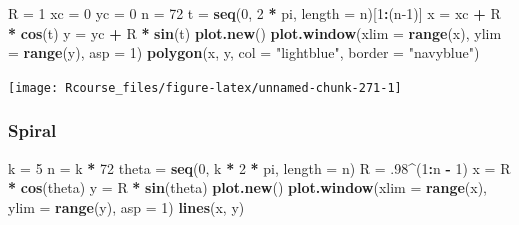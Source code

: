 \documentclass[]{book}
\newenvironment{Shaded}{\begin{snugshade}}{\end{snugshade}}
\newcommand{\DataTypeTok}[1]{\textcolor[rgb]{0.13,0.29,0.53}{#1}}
\newcommand{\DecValTok}[1]{\textcolor[rgb]{0.00,0.00,0.81}{#1}}
\newcommand{\FloatTok}[1]{\textcolor[rgb]{0.00,0.00,0.81}{#1}}
\newcommand{\KeywordTok}[1]{\textcolor[rgb]{0.13,0.29,0.53}{\textbf{#1}}}
\newcommand{\NormalTok}[1]{#1}
\newcommand{\OperatorTok}[1]{\textcolor[rgb]{0.81,0.36,0.00}{\textbf{#1}}}
\newcommand{\StringTok}[1]{\textcolor[rgb]{0.31,0.60,0.02}{#1}}
\theoremstyle{definition}
\theoremstyle{definition}
\theoremstyle{definition}
\theoremstyle{remark}
\begin{document}
\begin{Shaded}
\begin{Highlighting}[]
\NormalTok{R =}\StringTok{ }\DecValTok{1}
\NormalTok{xc =}\StringTok{ }\DecValTok{0}
\NormalTok{yc =}\StringTok{ }\DecValTok{0}
\NormalTok{n =}\StringTok{ }\DecValTok{72}
\NormalTok{t =}\StringTok{ }\KeywordTok{seq}\NormalTok{(}\DecValTok{0}\NormalTok{, }\DecValTok{2} \OperatorTok{*}\StringTok{ }\NormalTok{pi, }\DataTypeTok{length =}\NormalTok{ n)[}\DecValTok{1}\OperatorTok{:}\NormalTok{(n}\DecValTok{-1}\NormalTok{)]}
\NormalTok{x =}\StringTok{ }\NormalTok{xc }\OperatorTok{+}\StringTok{ }\NormalTok{R }\OperatorTok{*}\StringTok{ }\KeywordTok{cos}\NormalTok{(t)}
\NormalTok{y =}\StringTok{ }\NormalTok{yc }\OperatorTok{+}\StringTok{ }\NormalTok{R }\OperatorTok{*}\StringTok{ }\KeywordTok{sin}\NormalTok{(t)}
\KeywordTok{plot.new}\NormalTok{()}
\KeywordTok{plot.window}\NormalTok{(}\DataTypeTok{xlim =} \KeywordTok{range}\NormalTok{(x), }\DataTypeTok{ylim =} \KeywordTok{range}\NormalTok{(y), }\DataTypeTok{asp =} \DecValTok{1}\NormalTok{)}
\KeywordTok{polygon}\NormalTok{(x, y, }\DataTypeTok{col =} \StringTok{"lightblue"}\NormalTok{, }\DataTypeTok{border =} \StringTok{"navyblue"}\NormalTok{)}
\end{Highlighting}
\end{Shaded}

\texttt{[image: Rcourse\_files/figure-latex/unnamed-chunk-271-1]}

\hypertarget{spiral}{%
\subsubsection{Spiral}\label{spiral}}

\begin{Shaded}
\begin{Highlighting}[]
\NormalTok{k =}\StringTok{ }\DecValTok{5}
\NormalTok{n =}\StringTok{ }\NormalTok{k }\OperatorTok{*}\StringTok{ }\DecValTok{72}
\NormalTok{theta =}\StringTok{ }\KeywordTok{seq}\NormalTok{(}\DecValTok{0}\NormalTok{, k }\OperatorTok{*}\StringTok{ }\DecValTok{2} \OperatorTok{*}\StringTok{ }\NormalTok{pi, }\DataTypeTok{length =}\NormalTok{ n)}
\NormalTok{R =}\StringTok{ }\FloatTok{.98}\OperatorTok{^}\NormalTok{(}\DecValTok{1}\OperatorTok{:}\NormalTok{n }\OperatorTok{-}\StringTok{ }\DecValTok{1}\NormalTok{)}
\NormalTok{x =}\StringTok{ }\NormalTok{R }\OperatorTok{*}\StringTok{ }\KeywordTok{cos}\NormalTok{(theta)}
\NormalTok{y =}\StringTok{ }\NormalTok{R }\OperatorTok{*}\StringTok{ }\KeywordTok{sin}\NormalTok{(theta)}
\KeywordTok{plot.new}\NormalTok{()}
\KeywordTok{plot.window}\NormalTok{(}\DataTypeTok{xlim =} \KeywordTok{range}\NormalTok{(x), }\DataTypeTok{ylim =} \KeywordTok{range}\NormalTok{(y), }\DataTypeTok{asp =} \DecValTok{1}\NormalTok{)}
\KeywordTok{lines}\NormalTok{(x, y)}
\end{Highlighting}
\end{Shaded}
\end{document}
